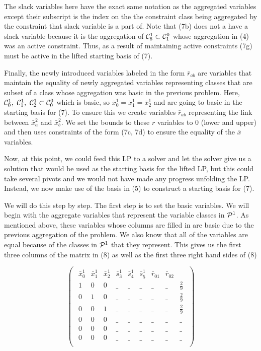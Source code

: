 \documentclass[11pt]{article} %
\newcommand{\cP}{{\cal P}}
\newcommand{\cC}{{\cal C}}
\begin{document}
	The slack variables here have the exact same notation as the aggregated variables except their subscript is the index on the the constraint class being aggregated by the constraint that slack variable is a part of.  Note that (7b) does not a have a slack variable because it is the aggregation of $\cC^1_6 \subset \cC^0_1$ whose aggregation in (4) was an active constraint.  Thus, as a result of maintaining active constraints (7g) must be active in the lifted starting basis of (7).
	
	Finally, the newly introduced variables labeled in the form $\bar{r}_{ab}$ are variables that maintain the equality of newly aggregated variables representing classes that are subset of a class whose aggregation was basic in the previous problem.  Here, $\cC^1_0, \ \cC^1_1, \ \cC^1_2 \subset \cC^0_0$ which is basic, so $\bar{x}_0^1 = \bar{x}_1^1 = \bar{x}_2^1$ and are going to basic in the starting basis for (7).  To ensure this we create variables $\bar{r}_{ab}$ representing the link between $\bar{x}_a^2$ and $\bar{x}_b^2$.  We set the bounds to these $r$ variables to 0 (lower and upper) and then uses constraints of the form (7c, 7d) to ensure the equality of the $\bar{x}$ variables.
	
	Now, at this point, we could feed this LP to a solver and let the solver give us a solution that would be used as the starting basis for the lifted LP, but this could take several pivots and we would not have made any progress unfolding the LP.  Instead, we now make use of the basis in (5) to construct a starting basis for (7). 
	
	We will do this step by step.  The first step is to set the basic variables.  We will begin with the aggregate variables that represent the variable classes in $\cP^1$.  As mentioned above, these variables whose columns are filled in are basic due to the previous aggregation of the problem.  We also know that all of the variables are equal because of the classes in $\cP^1$ that they represent.  This gives us the first three columns of the matrix in (8) as well as the first three right hand sides of (8)
	
	\begin{equation}
	\begin{pmatrix}
	\begin{array}{ccc|ccc|cc|c}
	\bar{x}^1_0 & \bar{x}^1_1 & \bar{x}^1_2 & \bar{s}^1_3 & \bar{s}^1_4 & \bar{s}^1_5 & \bar{r}_{01} & \bar{r}_{02} \\
	\hline
	1 & 0 & 0 & \_ & \_ &\_ & \_ & \_ & \frac{2}{9} \\ 
	0 & 1 & 0 & \_ & \_ &\_ & \_ & \_ & \frac{2}{9} \\ 
	0 & 0 & 1 & \_ & \_ &\_ & \_ & \_ & \frac{2}{9} \\ 
	0 & 0 & 0 &\_ & \_ &\_ & \_ & \_& \_ \\ 
	0 & 0 & 0 & \_ & \_ &\_ & \_ & \_& \_ \\
	0 & 0 & 0 &\_ & \_ &\_ & \_& \_ & \_ \\
	\end{array}
	\end{pmatrix}
	\end{equation}
	 
\end{document}
